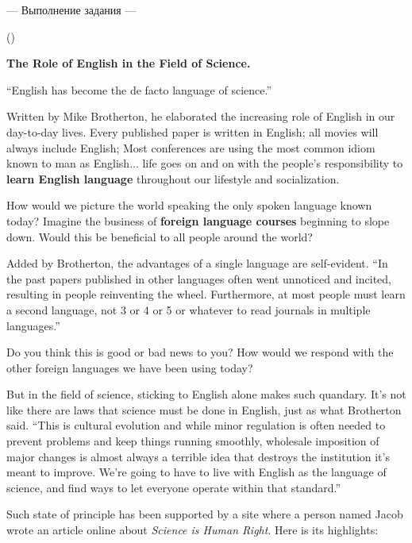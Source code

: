 \documentclass[main.tex]{subfiles}
\begin{document}
\newpage
{}

\hypertarget{ltask:2024-04-24-1}{--- Выполнение задания ---} (\hyperref[task:2024-04-24-1]{\color{blue}{перейти к тексту задания}})
\\


\textbf{The Role of English in the Field of Science.}

``English has become the de facto language of science.''

Written by Mike Brotherton, he elaborated the increasing role of English in our day-to-day lives. Every published paper is written in English; all movies will always include English; Most conferences are using the most common idiom known to man as English... life goes on and on with the people’s responsibility to \textbf{learn English language} throughout our lifestyle and socialization.

How would we picture the world speaking the only spoken language known today? Imagine the business of \textbf{foreign language courses} beginning to slope down. Would this be beneficial to all people around the world?

Added by Brotherton, the advantages of a single language are self-evident. ``In the past papers published in other languages often went unnoticed and incited, resulting in people reinventing the wheel. Furthermore, at most people must learn a second language, not 3 or 4 or 5 or whatever to read journals in multiple languages.''

Do you think this is good or bad news to you? How would we respond with the other foreign languages we have been using today?

But in the field of science, sticking to English alone makes such quandary. It’s not like there are laws that science must be done in English, just as what Brotherton said. ``This is cultural evolution and while minor regulation is often needed to prevent problems and keep things running smoothly, wholesale imposition of major changes is almost always a terrible idea that destroys the institution it’s meant to improve. We’re going to have to live with English as the language of science, and find ways to let everyone operate within that standard.''

Such state of principle has been supported by a site where a person named Jacob wrote an article online about \textit{Science is Human Right}. Here is its highlights:
\end{document}
